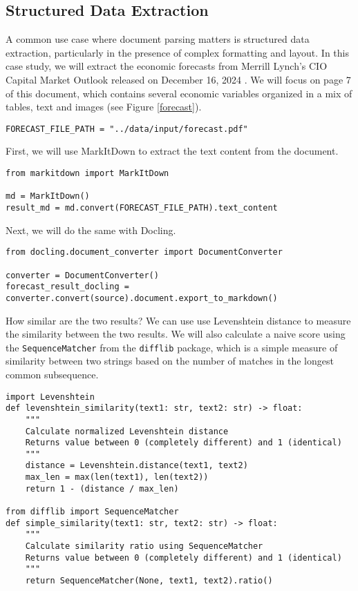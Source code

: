 \subsection{Structured Data Extraction}

A common use case where document parsing matters is structured data extraction, particularly in the presence of complex formatting and layout. In this case study, we will extract the economic forecasts from Merrill Lynch's CIO Capital Market Outlook released on December 16, 2024 . We will focus on page 7 of this document, which contains several economic variables organized in a mix of tables, text and images (see Figure \ref{forecast}).


\begin{verbatim}
FORECAST_FILE_PATH = "../data/input/forecast.pdf"
\end{verbatim}

First, we will use MarkItDown to extract the text content from the document.

\begin{verbatim}
from markitdown import MarkItDown

md = MarkItDown()
result_md = md.convert(FORECAST_FILE_PATH).text_content
\end{verbatim}

Next, we will do the same with Docling.

\begin{verbatim}
from docling.document_converter import DocumentConverter

converter = DocumentConverter()
forecast_result_docling = converter.convert(source).document.export_to_markdown()
\end{verbatim}
How similar are the two results? We can use use Levenshtein distance to measure the similarity between the two results. We will also calculate a naive score using the \texttt{SequenceMatcher} from the \texttt{difflib} package, which is a simple measure of similarity between two strings based on the number of matches in the longest common subsequence.

\begin{verbatim}
import Levenshtein
def levenshtein_similarity(text1: str, text2: str) -> float:
    """
    Calculate normalized Levenshtein distance
    Returns value between 0 (completely different) and 1 (identical)
    """
    distance = Levenshtein.distance(text1, text2)
    max_len = max(len(text1), len(text2))
    return 1 - (distance / max_len)

from difflib import SequenceMatcher
def simple_similarity(text1: str, text2: str) -> float:
    """
    Calculate similarity ratio using SequenceMatcher
    Returns value between 0 (completely different) and 1 (identical)
    """
    return SequenceMatcher(None, text1, text2).ratio()
\end{verbatim}

